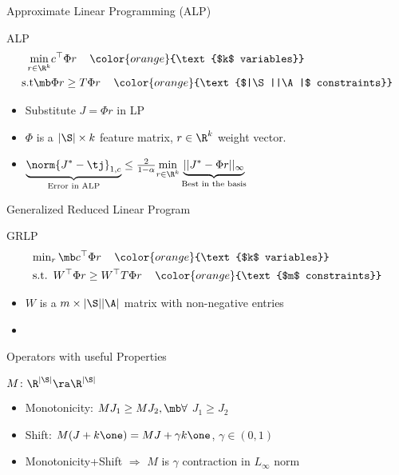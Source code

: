 \documentclass[handout,10pt]{beamer}
\begin{document}
\begin{frame}[fragile]{Approximate Linear Programming (ALP)}
\begin{block}{ALP \cite{schweitzer1985generalized,de2003linear}}
\begin{align*}
\min_{r\in \R^k} &c^\top \Phi r\,\quad{\color{orange}{\text{$k$ variables}}}\\
\text{s.t}\mb &\Phi r\geq T \Phi r\,\quad{\color{orange}{\text{$|\S||\A|$ constraints}}}
\end{align*}
\end{block}

\begin{itemize}
\item Substitute $J=\Phi r$ in LP
\item $\Phi$ is a $|\S|\times k$ feature matrix, $r\in \R^k$ weight vector.
\item $\underbrace{\norm{J^*-\tj}_{1,c}}_{\text{Error in ALP}}\leq \frac{2}{1-\alpha}\underset{r\in \R^k}{\min}\underbrace{||J^*-\Phi r||_{\infty}}_{\text{Best in the basis}}$
\end{itemize}
\begin{center}{\color{orange}{Need to reduce constraints}}\end{center}
\end{frame}

\begin{frame}[fragile]{Generalized Reduced Linear Program}
\begin{block}{GRLP}
\begin{align*}
&{\min}_r \,\mb c^\top \Phi r\,\quad{\color{orange}{\text{$k$ variables}}}\\
&\text{s.t.} \,\,\, W^\top  \Phi r\geq W^\top T \Phi r\,\quad{\color{orange}{\text{$m$ constraints}}}
\end{align*}
\end{block}

\begin{itemize}
\item $W$ is a $m\times |\S||\A|$ matrix with non-negative entries
\item {}
\end{itemize}
\end{frame}


\begin{frame}[fragile]{Operators with useful Properties}
\begin{block}{$M\colon \R^{|\S|}\ra\R^{|\S|}$}
\begin{itemize}
\item {Monotonicity:} $M J_1\geq M J_2, \mb \forall$ $J_1\geq J_2$
\item {Shift:} $M (J+k\one)= M J+\gamma k\one$, $\gamma \in (0,1)$
\item Monotonicity+Shift $\Rightarrow$ $M$ is $\gamma$ contraction in $L_\infty$ norm
\end{itemize}
\end{block}

\end{frame}
\end{document}
